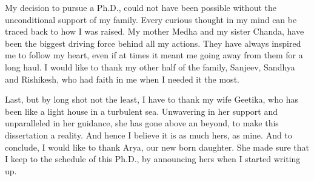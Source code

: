 \begin{acknowledgements}
My decision to pursue a Ph.D., could not have been possible without the unconditional support of my family. Every curious thought in my mind can be traced back to how I was raised. My mother Medha and my sister Chanda, have been the biggest driving force behind all my actions. They have always inspired me to follow my heart, even if at times it meant me going away from them for a long haul. I would like to thank my other half of the family, Sanjeev, Sandhya and Rishikesh, who had faith in me when I needed it the most.

Last, but by long shot not the least, I have to thank my wife Geetika, who has been like a light house in a turbulent sea. Unwavering in her support and unparalleled in her guidance, she has gone above an beyond, to make this dissertation a reality. And hence I believe it is as much hers, as mine. And to conclude, I would like to thank Arya, our new born daughter. She made sure that I keep to the schedule of this Ph.D., by announcing hers when I started writing up. 
\end{acknowledgements}
